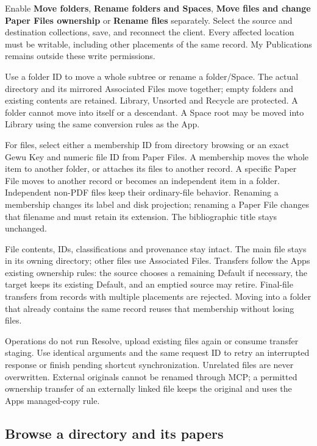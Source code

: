 \documentclass[10pt,letterpaper,oneside]{scrreprt}
\begin{document}
Enable \textbf{Move folders}, \textbf{Rename folders and Spaces}, \textbf{Move files and change Paper Files ownership} or \textbf{Rename files} separately. Select the source and destination collections, save, and reconnect the client. Every affected location must be writable, including other placements of the same record. My Publications remains outside these write permissions.

Use a folder ID to move a whole subtree or rename a folder/Space. The actual directory and its mirrored Associated Files move together; empty folders and existing contents are retained. Library, Unsorted and Recycle are protected. A folder cannot move into itself or a descendant. A Space root may be moved into Library using the same conversion rules as the App.

For files, select either a membership ID from directory browsing or an exact Gewu Key and numeric file ID from Paper Files. A membership moves the whole item to another folder, or attaches its files to another record. A specific Paper File moves to another record or becomes an independent item in a folder. Independent non-PDF files keep their ordinary-file behavior. Renaming a membership changes its label and disk projection; renaming a Paper File changes that filename and must retain its extension. The bibliographic title stays unchanged.

File contents, IDs, classifications and provenance stay intact. The main file stays in its owning directory; other files use Associated Files. Transfers follow the App\textquotesingle s existing ownership rules: the source chooses a remaining Default if necessary, the target keeps its existing Default, and an emptied source may retire. Final-file transfers from records with multiple placements are rejected. Moving into a folder that already contains the same record reuses that membership without losing files.

Operations do not run Resolve, upload existing files again or consume transfer staging. Use identical arguments and the same request ID to retry an interrupted response or finish pending shortcut synchronization. Unrelated files are never overwritten. External originals cannot be renamed through MCP; a permitted ownership transfer of an externally linked file keeps the original and uses the App\textquotesingle s managed-copy rule.

\subsection{Browse a directory and its papers}\label{browse-a-directory-and-its-papers}
\end{document}
